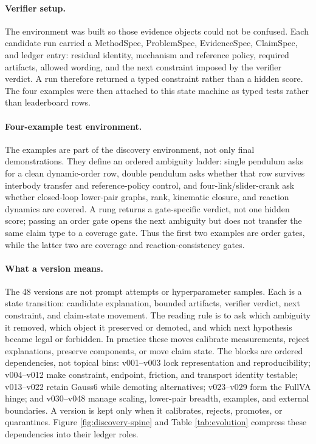 \documentclass[10pt]{article}
\begin{document}
\paragraph{Verifier setup.}
The environment was built so those evidence objects could not be confused. Each
candidate run carried a MethodSpec, ProblemSpec, EvidenceSpec, ClaimSpec, and
ledger entry: residual identity, mechanism and reference policy, required
artifacts, allowed wording, and the next constraint imposed by the verifier
verdict. A run therefore returned a typed constraint rather than a hidden score.
The four examples were then attached to this state machine as typed tests rather
than leaderboard rows.

\paragraph{Four-example test environment.}
The examples are part of the discovery environment, not only final
demonstrations. They define an ordered ambiguity ladder: single pendulum asks
for a clean dynamic-order row, double pendulum asks whether that row survives
interbody transfer and reference-policy control, and four-link/slider-crank ask
whether closed-loop lower-pair graphs, rank, kinematic closure, and reaction
dynamics are covered. A rung returns a gate-specific verdict, not one hidden
score; passing an order gate opens the next ambiguity but does not transfer the
same claim type to a coverage gate. Thus the first two examples are order
gates, while the latter two are coverage and reaction-consistency gates.

\paragraph{What a version means.}
The 48 versions are not prompt attempts or hyperparameter samples. Each is a
state transition: candidate explanation, bounded artifacts, verifier verdict,
next constraint, and claim-state movement. The reading rule is to ask which
ambiguity it removed, which object it preserved or demoted, and which next
hypothesis became legal or forbidden. In practice these moves calibrate
measurements, reject explanations, preserve components, or move claim state.
The blocks are ordered dependencies, not topical bins: v001--v003 lock
representation and reproducibility; v004--v012 make constraint, endpoint,
friction, and transport identity testable; v013--v022 retain Gauss6 while
demoting alternatives; v023--v029 form the FullVA hinge; and v030--v048 manage
scaling, lower-pair breadth, examples, and external boundaries. A version is
kept only when it calibrates, rejects, promotes, or quarantines. Figure
\ref{fig:discovery-spine} and Table \ref{tab:evolution} compress these
dependencies into their ledger roles.
\end{document}
